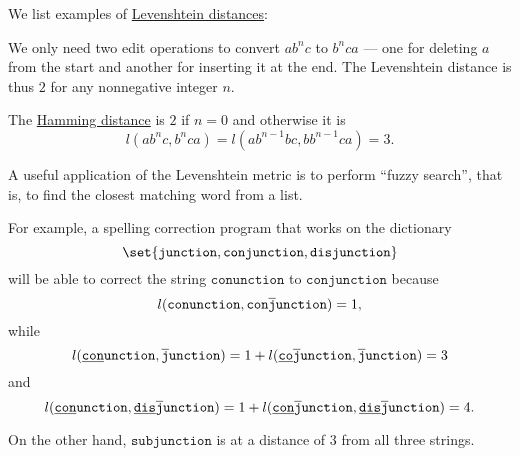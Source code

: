 \begin{example}\label{ex:def:levenshtein_distance}
  We list examples of \hyperref[def:levenshtein_distance]{Levenshtein distances}:
  \begin{thmenum}
     We only need two edit operations to convert \( a b^n c \) to \( b^n c a \) --- one for deleting \( a \) from the start and another for inserting it at the end. The Levenshtein distance is thus \( 2 \) for any nonnegative integer \( n \).

    The \hyperref[def:hamming_distance]{Hamming distance} is \( 2 \) if \( n = 0 \) and otherwise it is
    \begin{equation*}
      l(a b^n c, b^n c a) = l(a b^{n-1} b c, b b^{n-1} c a) = 3.
    \end{equation*}

     A useful application of the Levenshtein metric is to perform \enquote{fuzzy search}, that is, to find the closest matching word from a list.

    For example, a spelling correction program that works on the dictionary
    \begin{equation*}
      \set{ \texttt{junction}, \texttt{conjunction}, \texttt{disjunction} }
    \end{equation*}
    will be able to correct the string \( \texttt{conunction} \) to \( \texttt{conjunction} \) because
    \begin{equation*}
      l(\texttt{conunction}, \texttt{con}\oline{\texttt{j}}\texttt{unction}) = 1,
    \end{equation*}
    while
    \begin{equation*}
      l(\hi{\texttt{con}}\texttt{unction}, \oline{\texttt{j}}\texttt{unction}) = 1 + l(\hi{\texttt{co}}\oline{\texttt{j}}\texttt{unction}, \oline{\texttt{j}}\texttt{unction}) = 3
    \end{equation*}
    and
    \begin{equation*}
      l(\hi{\texttt{con}}\texttt{unction}, \hi{\texttt{dis}}\oline{\texttt{j}}\texttt{unction}) = 1 + l(\hi{\texttt{con}}\oline{\texttt{j}}\texttt{unction}, \hi{\texttt{dis}}\oline{\texttt{j}}\texttt{unction}) = 4.
    \end{equation*}

    On the other hand, \( \texttt{subjunction} \) is at a distance of \( 3 \) from all three strings.
  \end{thmenum}
\end{example}

